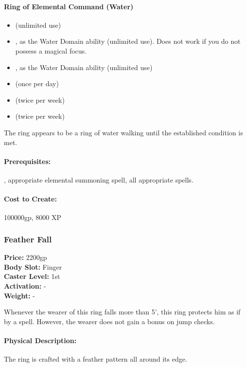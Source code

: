 \paragraph{Ring of Elemental Command (Water)}
\begin{itemize}
\item {} (unlimited use)
\item {}, as the Water Domain ability (unlimited use). Does not work if you do not possess a magical focus.
\item {}, as the Water Domain ability (unlimited use)
\item {} (once per day)
\item {} (twice per week)
\item {} (twice per week)
\end{itemize}
The ring appears to be a ring of water walking until the established condition is met.

\paragraph{Prerequisites:} , appropriate elemental summoning spell, all appropriate spells.

\paragraph{Cost to Create:} 100000gp, 8000 XP
\subsubsection{Feather Fall}
\label{Item:FeatherFall}
   \textbf{Price:} 2200gp
\\ \textbf{Body Slot:} Finger
\\ \textbf{Caster Level:} 1st
\\ \textbf{Activation:} -
\\ \textbf{Weight:} -

Whenever the wearer of this ring falls more than 5', this ring protects him as if by a  spell. However, the wearer does not gain a bonus on jump checks.

\paragraph{Physical Description:} The ring is crafted with a feather pattern all around its edge.

